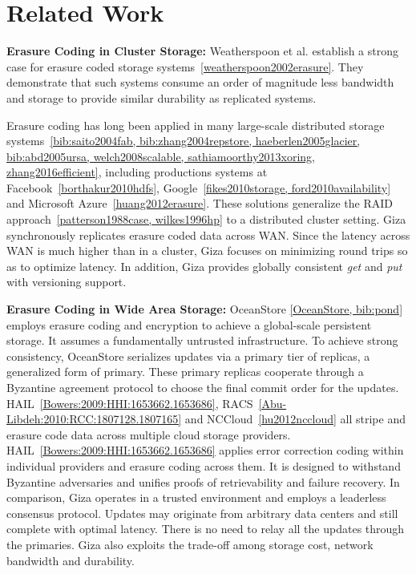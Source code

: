 \section{Related Work}


{\bf Erasure Coding in Cluster Storage:}
Weatherspoon et al. establish a strong case for erasure coded storage systems~\ref{weatherspoon2002erasure}. They demonstrate that such systems consume an order of magnitude less bandwidth and storage to provide similar durability as replicated systems.

Erasure coding has long been applied in many large-scale distributed storage systems~\ref{bib:saito2004fab, bib:zhang2004repstore, haeberlen2005glacier, bib:abd2005ursa, welch2008scalable, sathiamoorthy2013xoring, zhang2016efficient}, including productions systems at Facebook~\ref{borthakur2010hdfs}, Google~\ref{fikes2010storage, ford2010availability} and Microsoft Azure~\ref{huang2012erasure}. These solutions generalize the RAID approach~\ref{patterson1988case, wilkes1996hp} to a distributed cluster setting. Giza synchronously replicates erasure coded data across WAN. Since the latency across WAN is much higher than in a cluster, Giza focuses on minimizing round trips so as to optimize latency. In addition, Giza provides globally consistent {\em get} and {\em put} with versioning support.

{\bf Erasure Coding in Wide Area Storage:}
OceanStore \ref{OceanStore, bib:pond} employs erasure coding and encryption to achieve a global-scale persistent storage. It assumes a fundamentally untrusted infrastructure. To achieve strong consistency, OceanStore serializes updates via a primary tier of replicas, a generalized form of primary. These primary replicas cooperate through a Byzantine agreement protocol to choose the final commit order for the updates. 
HAIL~\ref{Bowers:2009:HHI:1653662.1653686}, RACS~\ref{Abu-Libdeh:2010:RCC:1807128.1807165} and NCCloud~\ref{hu2012nccloud} all stripe and erasure code data across multiple cloud storage providers. 
HAIL~\ref{Bowers:2009:HHI:1653662.1653686} applies error correction coding within individual providers and erasure coding across them. It is designed to withstand Byzantine adversaries and unifies proofs of retrievability and failure recovery. 
In comparison, Giza operates in a trusted environment and employs a leaderless consensus protocol. Updates may originate from arbitrary data centers and still complete with optimal latency. There is no need to relay all the updates through the primaries.  Giza also exploits the trade-off among storage cost, network bandwidth and durability.

